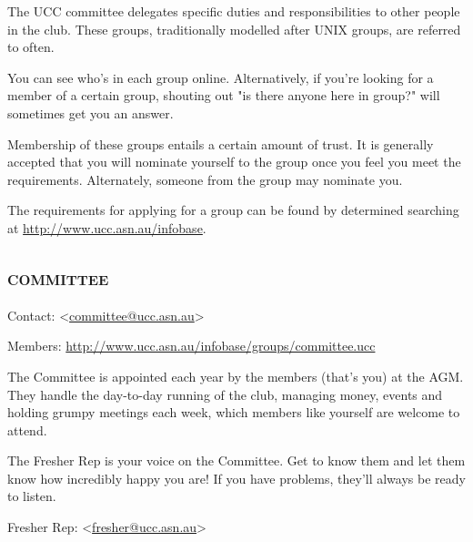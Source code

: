 
\newenvironment{uccgroup}[1]
{
	\begin{mdframed}
	\section{\textsc{#1}}
	\begin{mdframed}
		Contact: <\href{mailto:#1@ucc.asn.au}{#1@ucc.asn.au}>
	\end{mdframed}
	\begin{mdframed}
		Members: \url{http://www.ucc.asn.au/infobase/groups/#1.ucc}
	\end{mdframed}

	

}{\end{mdframed}}

\begin{mdframed}
The UCC committee delegates specific duties and responsibilities to other people in the club. These groups, traditionally modelled after UNIX groups, are referred to often.

You can see who's in each group online. Alternatively, if you're looking for a member of a certain group, shouting out "is there anyone here in group?" will sometimes get you an answer.


Membership of these groups entails a certain amount of trust. It is generally accepted that you will nominate yourself to the group once you feel you meet the requirements. Alternately, someone from the group may nominate you.

The requirements for applying for a group can be found by determined searching at \url{http://www.ucc.asn.au/infobase}.



\end{mdframed}

\begin{uccgroup}{committee}
The Committee is appointed each year by the members (that's you) at the AGM. They handle the day-to-day running of the club, managing money, events and holding grumpy meetings each week, which members like yourself are welcome to attend.


The Fresher Rep is your voice on the Committee. Get to know them and let them know how incredibly happy you are! If you have problems, they'll always be ready to listen.

\begin{mdframed}
Fresher Rep: <\href{mailto:fresher@ucc.asn.au}{fresher@ucc.asn.au}>
\end{mdframed}
\end{uccgroup}

